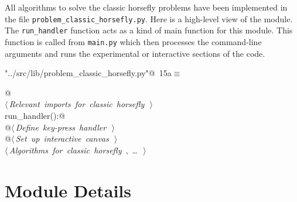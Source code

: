 \documentclass[12pt]{report}
\begin{document}
\newchunk 
All algorithms to solve the classic horsefly problems have been implemented in 
the file \verb|problem_classic_horsefly.py|. Here is a high-level view of the 
module. The \verb|run_handler| function acts as a kind of main function for this
module. This function is called from \verb|main.py| which then processes the 
command-line arguments and runs the experimental or interactive sections of
the code. 

\begin{flushleft} \small
\begin{minipage}{\linewidth}\label{scrap2}\raggedright\small
{} \verb@"../src/lib/problem_classic_horsefly.py"@\nobreak\ {\footnotesize {15a}}$\equiv$
\vspace{-1ex}
\begin{list}{}{} \item
\mbox{}\verb@    @\\
\mbox{}\verb@@\hbox{$\langle\,${\itshape Relevant imports for classic horsefly}\nobreak\ {\footnotesize {}}$\,\rangle$}\verb@@\\
\mbox{}\verb@def run_handler():@\\
\mbox{}\verb@    @\hbox{$\langle\,${\itshape Define key-press handler}\nobreak\ {\footnotesize {}}$\,\rangle$}\verb@@\\
\mbox{}\verb@    @\hbox{$\langle\,${\itshape Set up interactive canvas}\nobreak\ {\footnotesize {}}$\,\rangle$}\verb@@\\
\mbox{}\verb@@\hbox{$\langle\,${\itshape Algorithms for classic horsefly}\nobreak\ {\footnotesize {}, \ldots\ }$\,\rangle$}\verb@@\\
\mbox{}\verb@@{\NWsep}
\end{list}
\vspace{-1.5ex}
\footnotesize
\begin{list}{}{\setlength{\itemsep}{-\parsep}\setlength{\itemindent}{-\leftmargin}}

\item{}
\end{list}
\end{minipage}\vspace{4ex}
\end{flushleft}
\section{Module Details}
\end{document}
